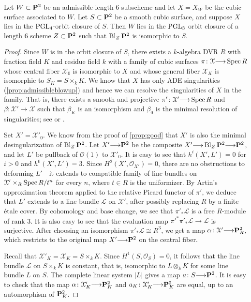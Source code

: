 \documentclass[12pt,reqno]{amsart}
\renewcommand{\k}{k}
\DeclareMathOperator{\Bl}{Bl}
\renewcommand{\to}{{\longrightarrow}}
\numberwithin{equation}{section}
\renewcommand{\O}{\mathcal O}
\begin{document}
\begin{proposition}\label{prop:cubictopoints}
  Let $W \subset \P^2$ be an admissible length 6 subscheme and let $X = X_W$ be the cubic surface associated to $W$.
  Let $S \subset \P^2$ be a smooth cubic surface, and suppose $X$ lies in the $\PGL_4$-orbit closure of $S$.
  Then $W$ lies in the $\PGL_3$ orbit closure of a length 6 scheme $Z \subset \P^2$ such that $\Bl_Z \P^2$ is isomorphic to $S$.
\end{proposition}
\begin{proof}
  Since $W$ is in the orbit closure of $S$, there exists a $\k$-algebra DVR $R$ with fraction field $K$ and residue field $k$ with a family of cubic surfaces $\pi \colon \mathcal X \to \spec R$ whose central fiber $\mathcal X_0$ is isomorphic to $X$ and whose general fiber $\mathcal X_K$ is isomorphic to $S_K = S \times_k K$.
  We know that $X$ has only ADE singularities (\autoref{prop:admissibleblowup}) and hence we can resolve the singularities of $X$ in the family.
  That is, there exists a smooth and projective $\pi' \colon \mathcal X' \to \spec R$ and $\beta \colon \mathcal X' \to \mathcal X$ such that $\beta_K$ is an isomorphism and $\beta_0$ is the minimal resolution of singularities; see \cite{bri:70} or \cite{tju:70}.

  Set $X' = \mathcal X'_0$.
  We know from the proof of \autoref{prop:good} that $X'$ is also the minimal desingularization of $\Bl_Z\P^2$.
  Let $X' \to \P^2$ be the composite $X' \to \Bl_Z \P^2 \to \P^2$, and let $L'$ be pullback of $\O(1)$ to $\mathcal X'_0$.
  It is easy to see that $h^i(X', L') = 0$ for $i > 0$ and $h^0(X', L') = 3$.
  Since $H^2(X', \O_{X'}) = 0$, there are no obstructions to deforming $L'$---it extends to compatible family of line bundles on $\mathcal X' \times_R \spec R/t^n$ for every $n$, where $t \in R$ is the uniformizer. 
  By Artin's approximation theorem \cite{art:69} applied to the relative Picard functor of $\pi'$, we deduce that $L'$ extends to a line bundle $\mathcal L$ on $\mathcal X'$, after possibly replacing $R$ by a finite \'etale cover.
  By cohomology and base change, we see that $\pi'_* \mathcal L$ is a free $R$-module of rank 3.
  It is also easy to see that the evaluation map $\pi'^*\pi'_* \mathcal L \to \mathcal L$ is surjective.
  After choosing an isomorphism $\pi'_* \mathcal L \cong R^3$, we get a map $\alpha \colon \mathcal X' \to \P^2_R$, which restricts to the original map $X' \to \P^2$ on the central fiber.
  
  Recall that $\mathcal X'_K = \mathcal X_K = S \times_k K$.
  Since $H^1(S, \O_S) = 0$, it follows that the line bundle $\mathcal L$ on $S \times_k K$ is constant, that is, isomorphic to $L \otimes_k K$ for some line bundle $L$ on $S$.
  The complete linear system $|L|$ gives a map $a \colon S \to \P^2$.
  It is easy to check that the map $\alpha \colon \mathcal X'_K \to \P^2_K$ and $a_K \colon \mathcal X'_K \to \P^2_K$ are equal, up to an automorphism of $\P^2_K$.
  

\end{proof}
\end{document}

